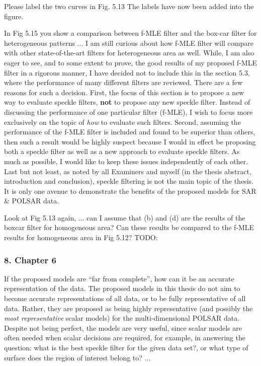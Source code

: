 \replyToComment
    {Please label the two curves in Fig. 5.13}
    {The labels have now been added into the figure.}    

\replyToComment
    {
      In Fig 5.15 you show a comparison between f-MLE filter and the box-car filter for heterogeneous patterns ...
      I am still curious about how f-MLE filter will compare with other state-of-the-art filters for heterogeneous area as well.
    }
    {
While, I am also eager to see, and to some extent to prove, the good results of my proposed f-MLE filter in a rigorous manner,
  I have decided not to include this in the section 5.3, where the performance of many different filters are reviewed.
There are a few reasons for such a decision.
First, the focus of this section is to propose a new way to evaluate speckle filters, \textbf{not} to propose any new speckle filter.
Instead of discussing the performance of one particular filter (f-MLE), I wish to focus more exclusively on the topic of \textit{how} to evaluate such filters.
Second, assuming the performance of the f-MLE filter is included and found to be superior than others,
  then such a result would be highly suspect
because I would in effect be proposing both a speckle filter as well as a new approach to evaluate speckle filters.
As much as possible, I would like to keep these issues independently of each other.
Last but not least, as noted by all Examiners and myself (in the thesis abstract, introduction and conclusion), speckle filtering is not the main topic of the thesis.
It is only one avenue to demonstrate the benefits of the proposed models for SAR \& POLSAR data.
    }

\replyToComment
    {
      Look at Fig 5.13 again, ... can I assume that (b) and (d) are the results of the boxcar filter for homogeneous area?
      Can these results be compared to the f-MLE results for homogeneous area in Fig 5.12?
    }
    {
      TODO:
    }    
    
\subsubsection*{8. Chapter 6}

\replyToComment
    {If the proposed models are ``far from complete'', how can it be an accurate representation of the data.}
    {The proposed models in this thesis do not aim to become accurate representations of all data, or to be fully representative of all data.
Rather, they are proposed as being highly representative (and possibly the \textit{most representative} scalar models) for the multi-dimensional POLSAR data.
Despite not being perfect, the models are very useful, since scalar models are often needed when scalar decisions are required,
  for example, in answering the question: what is the best speckle filter for the given data set?, or what type of surface does the region of interest belong to? ...
}

